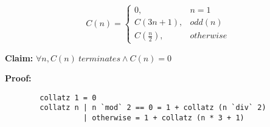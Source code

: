 \documentclass{article}
\begin{document}
\begin{problem}
    \begin{subproblem}
        \lipsum[64]

        \[
                C(n) = \begin{cases}
                    0, & n = 1 \\
                    C(3n + 1), & odd(n) \\
                    C\left(\frac{n}{2}\right), & otherwise
                \end{cases}
        \]

        \begin{shift}
            \textbf{Claim:} $\forall n, C(n)\ terminates\land C(n) = 0$

            \textbf{Proof:} \lipsum[75]

            \begin{ipart}
                \lipsum[75]
            \end{ipart}
            \begin{ipart}
                \lipsum[75]
            \end{ipart}
            \begin{ipart}
                \lipsum[75]
            \end{ipart}
            \begin{ipart}
                \lipsum[75]
            \end{ipart}
        \end{shift}
    \end{subproblem}

    \begin{subproblem}

    \begin{verbatim}
        collatz 1 = 0
        collatz n | n `mod` 2 == 0 = 1 + collatz (n `div` 2)
                  | otherwise = 1 + collatz (n * 3 + 1)
    \end{verbatim}

    \end{subproblem}
\end{problem}
\end{document}
